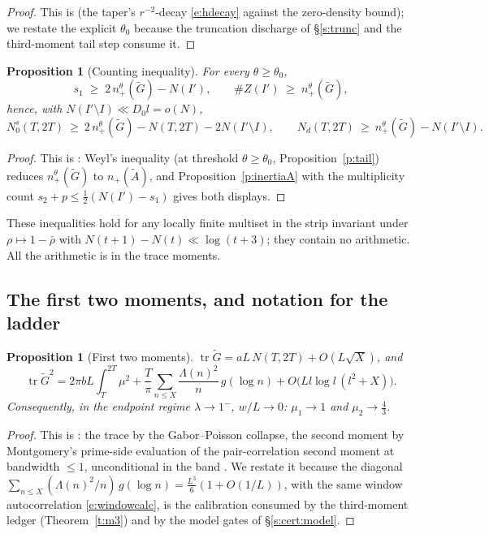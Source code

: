 \documentclass[11pt]{article}
\numberwithin{equation}{section}
\newtheorem{proposition}[theorem]{Proposition}
\theoremstyle{definition}
\theoremstyle{remark}
\newcommand{\LL}{\Lambda}
\begin{document}
\begin{proof}
This is \cite[Prop.~4.2]{C26} (the taper's $r^{-2}$-decay
\eqref{e:hdecay} against the zero-density bound); we restate the
explicit $\theta_0$ because the truncation discharge of
\S\ref{s:trunc} and the third-moment tail step consume it.
\end{proof}

\begin{proposition}[Counting inequality]\label{p:count}
For every $\theta\ge\theta_0$,
\[
s_1\;\ge\;2\,n_+^{\theta}(\widetilde G)-N(I'),
\qquad
\#Z(I')\;\ge\;n_+^{\theta}(\widetilde G),
\]
hence, with $N(I'\setminus I)\ll D_0l=o(N)$,
\begin{equation}\label{e:count}
N_0^{s}(T,2T)\ \ge\ 2\,n_+^{\theta}(\widetilde G)
-N(T,2T)-2N(I'\setminus I),
\qquad
N_d(T,2T)\ \ge\ n_+^{\theta}(\widetilde G)
-N(I'\setminus I).
\end{equation}
\end{proposition}

\begin{proof}
This is \cite[Prop.~4.5]{C26}: Weyl's inequality (at threshold
$\theta\ge\theta_0$, Proposition~\ref{p:tail}) reduces
$n_+^{\theta}(\widetilde G)$ to $n_+(\widetilde A)$, and
Proposition~\ref{p:inertiaA} with the multiplicity count
$s_2+p\le\tfrac12(N(I')-s_1)$ gives both displays.
\end{proof}

These inequalities hold for any locally finite multiset in the
strip invariant under $\rho\mapsto1-\bar\rho$ with
$N(t+1)-N(t)\ll\log(t+3)$; they contain no arithmetic. All
the arithmetic is in the trace moments.

\subsection{The first two moments, and
notation for the ladder}\label{s:frame:moments}

\begin{proposition}[First two moments]\label{p:mu12}
$\operatorname{tr}\widetilde G=aL\,N(T,2T)+O(L\sqrt X)$, and
\[
\operatorname{tr}\widetilde G^{2}
=2\pi bL\int_T^{2T}\mu^{2}
+\frac{T}{\pi}\sum_{n\le X}\frac{\LL(n)^{2}}{n}\,
g(\log n)+O\bigl(Ll\log l\,(l^{2}+X)\bigr).
\]
Consequently, in the endpoint regime $\lambda\to1^-$,
$w/L\to0$: $\mu_1\to1$ and $\mu_2\to\tfrac43$.
\end{proposition}

\begin{proof}
This is \cite[Prop.~5.3 and Thm.~5.8]{C26}: the trace by the
Gabor--Poisson collapse, the second moment by Montgomery's
prime-side evaluation of the pair-correlation second moment at
bandwidth $\le1$, unconditional in the band
\cite{Mon73,BGST}. We restate it because the diagonal
$\sum_{n\le X}(\LL(n)^{2}/n)\,g(\log n)
=\tfrac{L^{3}}{6}(1+O(1/L))$, with the same window
autocorrelation \eqref{e:windowcalc}, is the calibration
consumed by the third-moment ledger (Theorem~\ref{t:m3}) and
by the model gates of \S\ref{s:cert:model}.
\end{proof}
\end{document}
